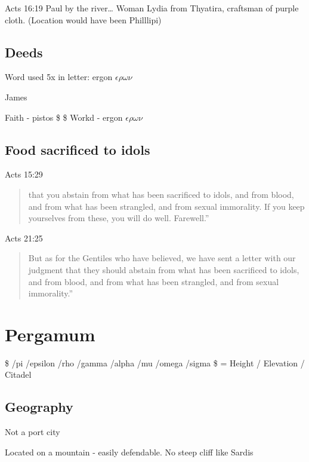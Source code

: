 \documentclass[
]{book}
\begin{document}
Acts 16:19 Paul by the river\ldots{} Woman Lydia from Thyatira, craftsman of purple cloth. (Location would have been Philllipi)

\hypertarget{deeds}{%
\section{Deeds}\label{deeds}}

Word used 5x in letter: ergon \(\epsilon \rho \omega \nu\)

James

Faith - pistos \$ \pi \iota \sigma \tau \omega \sigma \$
Workd - ergon \(\epsilon \rho \omega \nu\)

\hypertarget{food-sacrificed-to-idols}{%
\section{Food sacrificed to idols}\label{food-sacrificed-to-idols}}

Acts 15:29

\begin{quote}
that you abstain from what has been sacrificed to idols, and from blood, and from what has been strangled, and from sexual immorality. If you keep yourselves from these, you will do well. Farewell.''
\end{quote}

Acts 21:25

\begin{quote}
But as for the Gentiles who have believed, we have sent a letter with our judgment that they should abstain from what has been sacrificed to idols, and from blood, and from what has been strangled, and from sexual immorality.''
\end{quote}

\hypertarget{pergamum}{%
\chapter{Pergamum}\label{pergamum}}

\$ /pi /epsilon /rho /gamma /alpha /mu /omega /sigma \$ = Height / Elevation / Citadel

\hypertarget{geography-2}{%
\section{Geography}\label{geography-2}}

Not a port city

Located on a mountain - easily defendable. No steep cliff like Sardis
\end{document}
